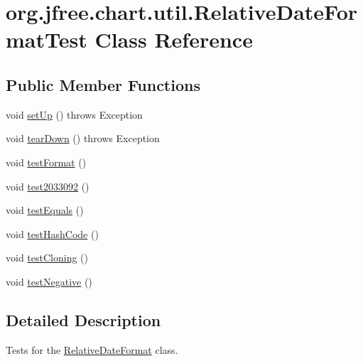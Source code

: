 \hypertarget{classorg_1_1jfree_1_1chart_1_1util_1_1_relative_date_format_test}{}\section{org.\+jfree.\+chart.\+util.\+Relative\+Date\+Format\+Test Class Reference}
\label{classorg_1_1jfree_1_1chart_1_1util_1_1_relative_date_format_test}
\subsection*{Public Member Functions}
\begin{DoxyCompactItemize}
\item 
void \mbox{\hyperlink{classorg_1_1jfree_1_1chart_1_1util_1_1_relative_date_format_test_a2f0191a5b0dc08de1615cb909e6b12d8}{set\+Up}} ()  throws Exception 
\item 
void \mbox{\hyperlink{classorg_1_1jfree_1_1chart_1_1util_1_1_relative_date_format_test_ae44b7ff9534aa4d90bbadf697cbff2f8}{tear\+Down}} ()  throws Exception 
\item 
void \mbox{\hyperlink{classorg_1_1jfree_1_1chart_1_1util_1_1_relative_date_format_test_ae48d8e6ec837a2faa29267f386887819}{test\+Format}} ()
\item 
void \mbox{\hyperlink{classorg_1_1jfree_1_1chart_1_1util_1_1_relative_date_format_test_a4c355d1ce9af6e1988fe91f67543567f}{test2033092}} ()
\item 
void \mbox{\hyperlink{classorg_1_1jfree_1_1chart_1_1util_1_1_relative_date_format_test_ab64124c636bf346794babf5451cc44ce}{test\+Equals}} ()
\item 
void \mbox{\hyperlink{classorg_1_1jfree_1_1chart_1_1util_1_1_relative_date_format_test_a0536004fe16a9013c1acefbd995c8a53}{test\+Hash\+Code}} ()
\item 
void \mbox{\hyperlink{classorg_1_1jfree_1_1chart_1_1util_1_1_relative_date_format_test_a3fb7a924267519029177142fedb5dd75}{test\+Cloning}} ()
\item 
void \mbox{\hyperlink{classorg_1_1jfree_1_1chart_1_1util_1_1_relative_date_format_test_af64826bdbe1df1a40a42b1d62c5d6bb8}{test\+Negative}} ()
\end{DoxyCompactItemize}


\subsection{Detailed Description}
Tests for the \mbox{\hyperlink{classorg_1_1jfree_1_1chart_1_1util_1_1_relative_date_format}{Relative\+Date\+Format}} class. 

